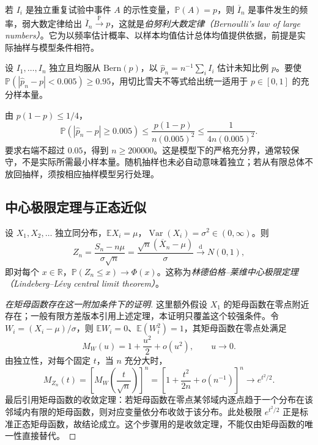 若 $I_i$ 是独立重复试验中事件 $A$ 的示性变量，$\mathbb P(A)=p$，则 $\overline I_n$ 是事件发生的频率，弱大数定律给出 $\overline I_n\xrightarrow{\mathbb P}p$，这就是\emph{伯努利大数定律（Bernoulli's law of large numbers）}。它为以频率估计概率、以样本均值估计总体均值提供依据，前提是实际抽样与模型条件相符。

\begin{example}
\label{ex:study-survey-sample-size}
设 $I_1,\ldots,I_n$ 独立且均服从 $\mathrm{Bern}(p)$，以 $\widehat p_n=n^{-1}\sum_iI_i$ 估计未知比例 $p$。要使 $\mathbb P(|\widehat p_n-p|<0.005)\ge0.95$，用切比雪夫不等式给出统一适用于 $p\in[0,1]$ 的充分样本量。
\end{example}

\begin{solve}
由 $p(1-p)\le1/4$，
\[
  \mathbb P(|\widehat p_n-p|\ge0.005)
    \le\frac{p(1-p)}{n(0.005)^2}
    \le\frac1{4n(0.005)^2}.
\]
要求右端不超过 $0.05$，得到 $n\ge200000$。这是模型下的严格充分界，通常较保守，不是实际所需最小样本量。随机抽样也未必自动意味着独立；若从有限总体不放回抽样，须按相应抽样模型另行处理。
\end{solve}

\subsection{中心极限定理与正态近似}
\label{subsec:study-central-limit-theorem}

\begin{theorem}
\label{thm:study-iid-clt}
设 $X_1,X_2,\ldots$ 独立同分布，$\mathbb E X_i=\mu$，$\operatorname{Var}(X_i)=\sigma^2\in(0,\infty)$。则
\begin{equation}
  Z_n=\frac{S_n-n\mu}{\sigma\sqrt n}
    =\frac{\sqrt n(\overline X_n-\mu)}\sigma
    \xrightarrow{\mathrm d}N(0,1),
  \label{eq:study-iid-clt}
\end{equation}
即对每个 $x\in\mathbb R$，$\mathbb P(Z_n\le x)\to\Phi(x)$。这称为\emph{林德伯格--莱维中心极限定理（Lindeberg--Lévy central limit theorem）}。
\end{theorem}

\begin{proof}[在矩母函数存在这一附加条件下的证明]
这里额外假设 $X_1$ 的矩母函数在零点附近存在；一般有限方差版本引用上述定理，本证明只覆盖这个较强条件。令 $W_i=(X_i-\mu)/\sigma$，则 $\mathbb E W_i=0$、$\mathbb E(W_i^2)=1$，其矩母函数在零点处满足
\[
  M_W(u)=1+\frac{u^2}{2}+o(u^2),\qquad u\to0.
\]
由独立性，对每个固定 $t$，当 $n$ 充分大时，
\[
  M_{Z_n}(t)=\left[M_W\left(\frac{t}{\sqrt n}\right)\right]^n
    =\left[1+\frac{t^2}{2n}+o(n^{-1})\right]^n
    \longrightarrow e^{t^2/2}.
\]
最后引用矩母函数的收敛定理：若矩母函数在零点某邻域内逐点趋于一个分布在该邻域内有限的矩母函数，则对应变量依分布收敛于该分布。此处极限 $e^{t^2/2}$ 正是标准正态矩母函数，故结论成立。这个步骤用的是收敛定理，不能仅由矩母函数的唯一性直接替代。
\end{proof}


